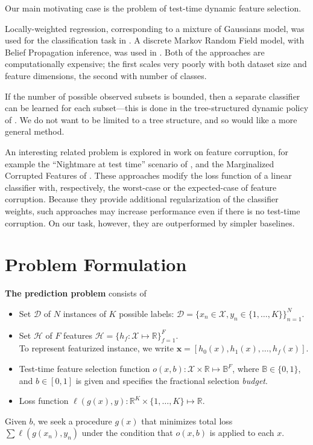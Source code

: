 Our main motivating case is the problem of test-time dynamic feature selection.

Locally-weighted regression, corresponding to a mixture of Gaussians model, was used for the classification task in \cite{Gao-NIPS-2011}.
A discrete Markov Random Field model, with Belief Propagation inference, was used in \cite{Karayev-NIPS-2012}.
Both of the approaches are computationally expensive; the first scales very poorly with both dataset size and feature dimensions, the second with number of classes.

If the number of possible observed subsets is bounded, then a separate classifier can be learned for each subset---this is done in the tree-structured dynamic policy of \cite{Xu-ICML-2013}.
We do not want to be limited to a tree structure, and so would like a more general method.

An interesting related problem is explored in work on feature corruption, for example the ``Nightmare at test time'' scenario of \cite{Globerson-ICML-2006}, and the Marginalized Corrupted Features of \cite{Maaten-ICML-2013}.
These approaches modify the loss function of a linear classifier with, respectively, the worst-case or the expected-case of feature corruption.
Because they provide additional regularization of the classifier weights, such approaches may increase performance even if there is no test-time corruption.
On our task, however, they are outperformed by simpler baselines.

\section{Problem Formulation}


\begin{mydef} \label{def:problem}
\textbf{The prediction problem} consists of
\begin{itemize}
\item Set $\mathcal{D}$ of $N$ instances of $K$ possible labels: $\mathcal{D} = \{x_n \in \mathcal{X}, y_n \in \{1, \dots, K\}\}_{n=1}^N$.

\item Set $\mathcal{H}$ of $F$ features $\mathcal{H} = \{h_f : \mathcal{X} \mapsto \mathbb{R} \}_{f=1}^F$.\\
To represent featurized instance, we write $\mathbf{x} = [h_0(x), h_1(x), \dots, h_f(x)]$.

\item Test-time feature selection function $o(x, b): \mathcal{X} \times \mathbb{R} \mapsto \mathbb{B}^F$, where $\mathbb{B} \in \{0, 1\}$, and $b \in [0, 1]$ is given and specifies the fractional selection \emph{budget}.

\item Loss function $\ell(g(x), y): \mathbb{R}^K \times \{1, \dots, K\} \mapsto \mathbb{R}$.
\end{itemize}

Given $b$, we seek a procedure $g(x)$ that minimizes total loss $\sum \ell(g(x_n), y_n)$ under the condition that $o(x, b)$ is applied to each $x$.
\end{mydef}

